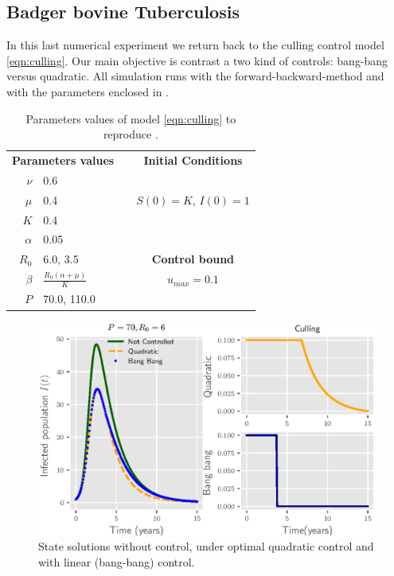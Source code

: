 \subsection*{Badger bovine Tuberculosis}
In this last numerical experiment we return back to the culling control model
\eqref{eqn:culling}. Our main objective is contrast a two kind of controls: 
bang-bang versus quadratic. All simulation runs with the 
forward-backward-method and with the parameters enclosed in .


\begin{table}[H]
  \begin{center}
    \begin{tabular}{@{}rllc@{}}
      \toprule
      \multicolumn{2}{c}{\textbf{Parameters values}}
      &&
      \textbf{Initial Conditions}
      \\
      \cmidrule{1-2}
      \cmidrule{4-4}
      $\nu$
        & \num{0.6}
      \\
      $\mu$
        & \num{0.4}
        &&  
          $S(0) = K$, 
          $I(0) = 1$
      \\
      $K$
        & \num{0.4}
      \\
      $\alpha$
        & \num{0.05}
      \\
      $R_0$
        & \num{6.0}, \num{3.5}
        && 
          \textbf{Control bound}
      \\
      \cmidrule{4-4}
      $\beta$
        &
         $
          \displaystyle
          \frac{R_0(\alpha + \mu)}{K}
         $
        &&
          $u_{max} = \num{0.1}$
      \\
      $P$
        & \num{70.0}, \num{110.0}
      \\
      \bottomrule
    \end{tabular}
  \end{center}
  \caption{Parameters values of model \eqref{eqn:culling} to reproduce 
  .}
  \label{tbl:culling}
\end{table}

\begin{figure}[H]
  \centering
  \includegraphics{Figures/figure_1_culling}
  \caption{State solutions without control, under optimal quadratic control 
  and with linear (bang-bang) control.}
  \label{fig:figure1culling}
\end{figure}

